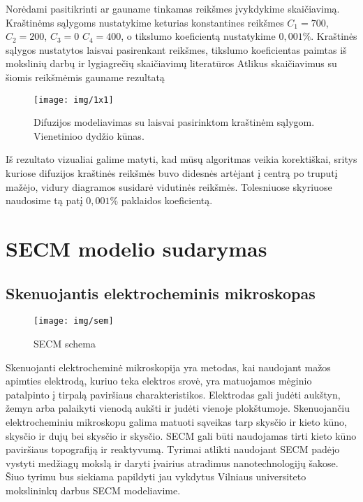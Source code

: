 \documentclass{VUMIFPSkursinis}
\begin{document}
Norėdami pasitikrinti ar gauname tinkamas reikšmes įvykdykime skaičiavimą.
Kraštinėms sąlygoms nustatykime keturias konstantines reikšmes $C_1=700$, $C_2=200$, $C_3=0$ $C_4=400$, o tikslumo koeficientą nustatykime $0,001\%$.
Kraštinės sąlygos nustatytos laisvai pasirenkant reikšmes, tikslumo koeficientas paimtas iš mokslinių darbų \cite{Astr} \cite{Pois} ir lygiagrečių skaičiavimų literatūros \cite{Lygeg}
Atlikus skaičiavimus su šiomis reikšmėmis gauname rezultatą

\begin{figure}[H]
\centering
\texttt{[image: img/1x1]}
\caption{Difuzijos modeliavimas su laisvai pasirinktom kraštinėm sąlygom. Vienetinioo dydžio kūnas.} %
\label{img:text}
\end{figure}


Iš rezultato vizualiai galime matyti, kad mūsų algoritmas veikia korektiškai, sritys kuriose difuzijos kraštinės reikšmės buvo didesnės artėjant į centrą po truputį mažėjo, vidury diagramos susidarė vidutinės reikšmės.
Tolesniuose skyriuose naudosime tą patį $0,001\%$ paklaidos koeficientą.






\pagebreak

\section{SECM modelio sudarymas}
\subsection{Skenuojantis elektrocheminis mikroskopas}
\begin{figure}[H]
\centering
\texttt{[image: img/sem]}
\caption{SECM schema} %
\label{img:text}
\end{figure}

Skenuojanti elektrocheminė mikroskopija yra metodas, kai naudojant mažos apimties elektrodą, kuriuo teka elektros srovė, yra matuojamos mėginio patalpinto į tirpalą paviršiaus charakteristikos.
Elektrodas gali judėti aukštyn, žemyn arba palaikyti vienodą aukšti ir judėti vienoje plokštumoje.
Skenuojančiu elektrocheminiu mikroskopu galima matuoti sąveikas tarp skysčio ir kieto kūno, skysčio ir dujų bei skysčio ir skysčio.
SECM gali būti naudojamas tirti kieto kūno paviršiaus topografiją ir reaktyvumą.
Tyrimai atlikti naudojant SECM padėjo vystyti medžiagų mokslą ir daryti įvairius atradimus nanotechnologijų šakose.
Šiuo tyrimu bus siekiama papildyti jau vykdytus Vilniaus universiteto mokslininkų darbus SECM modeliavime.
\end{document}
